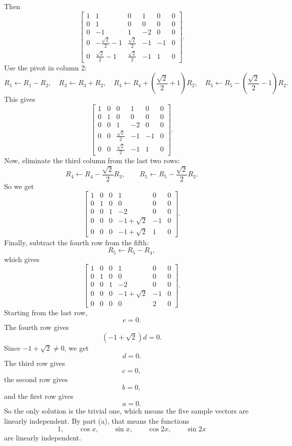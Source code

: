 \documentclass[10pt]{extarticle}
\begin{document}
\begin{enumerate}[label=(\alph*)]
\[\]
Then
\[
\left[
\begin{array}{ccccc|c}
1 & 1 & 0 & 1 & 0 & 0\\
0 & 1 & 0 & 0 & 0 & 0\\
0 & -1 & 1 & -2 & 0 & 0\\
0 & -\frac{\sqrt{2}}{2}-1 & \frac{\sqrt{2}}{2} & -1 & -1 & 0\\[0.4em]
0 & \frac{\sqrt{2}}{2}-1 & \frac{\sqrt{2}}{2} & -1 & 1 & 0
\end{array}
\right].
\]
Use the pivot in column $2$:
\[
R_1\leftarrow R_1-R_2,\quad
R_3\leftarrow R_3+R_2,\quad
R_4\leftarrow R_4+\left(\frac{\sqrt{2}}{2}+1\right)R_2,\quad
R_5\leftarrow R_5-\left(\frac{\sqrt{2}}{2}-1\right)R_2.
\]
This gives
\[
\left[
\begin{array}{ccccc|c}
1 & 0 & 0 & 1 & 0 & 0\\
0 & 1 & 0 & 0 & 0 & 0\\
0 & 0 & 1 & -2 & 0 & 0\\
0 & 0 & \frac{\sqrt{2}}{2} & -1 & -1 & 0\\[0.4em]
0 & 0 & \frac{\sqrt{2}}{2} & -1 & 1 & 0
\end{array}
\right].
\]
Now, eliminate the third column from the last two rows:
\[
R_4\leftarrow R_4-\frac{\sqrt{2}}{2}R_3,\qquad
R_5\leftarrow R_5-\frac{\sqrt{2}}{2}R_3.
\]
So we get
\[
\left[
\begin{array}{ccccc|c}
1 & 0 & 0 & 1 & 0 & 0\\
0 & 1 & 0 & 0 & 0 & 0\\
0 & 0 & 1 & -2 & 0 & 0\\
0 & 0 & 0 & -1+\sqrt{2} & -1 & 0\\
0 & 0 & 0 & -1+\sqrt{2} & 1 & 0
\end{array}
\right].
\]
Finally, subtract the fourth row from the fifth:
\[
R_5\leftarrow R_5-R_4,
\]
which gives
\[
\left[
\begin{array}{ccccc|c}
1 & 0 & 0 & 1 & 0 & 0\\
0 & 1 & 0 & 0 & 0 & 0\\
0 & 0 & 1 & -2 & 0 & 0\\
0 & 0 & 0 & -1+\sqrt{2} & -1 & 0\\
0 & 0 & 0 & 0 & 2 & 0
\end{array}
\right].
\]
Starting from the last row,
\[
e=0.
\]
The fourth row gives
\[
(-1+\sqrt{2})d=0.
\]
Since $-1+\sqrt{2}\neq 0$, we get
\[
d=0.
\]
The third row gives
\[
c=0,
\]
the second row gives
\[
b=0,
\]
and the first row gives
\[
a=0.
\]
So the only solution is the trivial one, which means the five sample vectors are linearly independent. By part (a), that means the functions
\[
1,\qquad \cos x,\qquad \sin x,\qquad \cos 2x,\qquad \sin 2x
\]
are linearly independent.
\end{enumerate}
\end{document}
